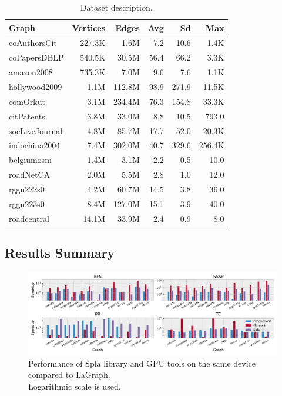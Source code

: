 \begin{table}[tbp]
\caption{Dataset description.} 
\begin{center}
    \begin{tabular}{|l|r|r|r|r|r|}
    \hline
    Graph&Vertices&Edges&Avg&Sd&Max\\
    \hline
    \hline
    coAuthorsCit&227.3K&1.6M&7.2&10.6&1.4K\\
    coPapersDBLP&540.5K&30.5M&56.4&66.2&3.3K\\
    amazon2008&735.3K&7.0M&9.6&7.6&1.1K\\
    hollywood2009&1.1M&112.8M&98.9&271.9&11.5K\\
    comOrkut&3.1M&234.4M&76.3&154.8&33.3K\\
    citPatents&3.8M&33.0M&8.8&10.5&793.0\\
    socLiveJournal&4.8M&85.7M&17.7&52.0&20.3K\\
    indochina2004&7.4M&302.0M&40.7&329.6&256.4K\\
    \hline
    belgiumosm&1.4M&3.1M&2.2&0.5&10.0\\
    roadNetCA&2.0M&5.5M&2.8&1.0&12.0\\
    rggn222s0&4.2M&60.7M&14.5&3.8&36.0\\
    rggn223s0&8.4M&127.0M&15.1&3.9&40.0\\
    roadcentral&14.1M&33.9M&2.4&0.9&8.0\\
    \hline
    \end{tabular}
    \label{dataset:info}
\end{center}
\end{table}

\subsection{Results Summary}

\begin{figure}[tbp]
\centering
\includegraphics[width=1.0\linewidth]{plots/rq1_rel.pdf}
\caption{Performance of Spla library and GPU tools on the same device compared to LaGraph.\\ Logarithmic scale is used.}
\label{fig:rq1_chart}
\end{figure}

